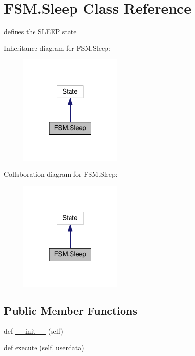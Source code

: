 \hypertarget{classFSM_1_1Sleep}{}\section{F\+S\+M.\+Sleep Class Reference}
\label{classFSM_1_1Sleep}


defines the S\+L\+E\+EP state  




Inheritance diagram for F\+S\+M.\+Sleep\+:\nopagebreak
\begin{figure}[H]
\begin{center}
\leavevmode
\includegraphics[width=145pt]{classFSM_1_1Sleep__inherit__graph}
\end{center}
\end{figure}


Collaboration diagram for F\+S\+M.\+Sleep\+:\nopagebreak
\begin{figure}[H]
\begin{center}
\leavevmode
\includegraphics[width=145pt]{classFSM_1_1Sleep__coll__graph}
\end{center}
\end{figure}
\subsection*{Public Member Functions}
\begin{DoxyCompactItemize}
\item 
def \hyperlink{classFSM_1_1Sleep_a54af482c09a00a2c1624fba609c4f780}{\+\_\+\+\_\+init\+\_\+\+\_\+} (self)
\item 
def \hyperlink{classFSM_1_1Sleep_ad9e21d03aeeb758686055fb3ca68a639}{execute} (self, userdata)
\end{DoxyCompactItemize}
